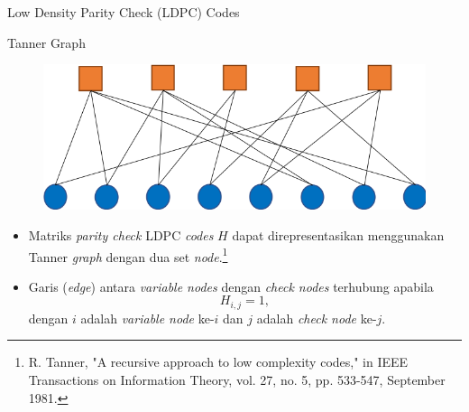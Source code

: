 \documentclass[11pt, aspectratio=169]{beamer}
\begin{document}
\begin{frame}{Low Density Parity Check (LDPC) Codes}
\begin{figure}
\begin{picture}
{		}
		
		\end{picture}
	\end{figure}

	
\end{frame}
\begin{frame}{Tanner Graph}
\vspace{-1cm}
\begin{figure}
\centering 
\includegraphics[scale=0.6]{gambarafa/TannerH}
\centering 
\label{sistemmodelMQCLDPC} %
\end{figure}

\begin{itemize}
\item Matriks \textit{parity check} LDPC \textit{codes} $H$ dapat direpresentasikan menggunakan Tanner \textit{graph} dengan dua set \textit{node}.\footnote[1]{\tiny R. Tanner, "A recursive approach to low complexity codes," in IEEE Transactions on Information Theory, vol. 27, no. 5, pp. 533-547, September 1981.
} 
\item Garis (\textit{edge}) antara \textit{variable nodes} dengan \textit{check nodes} terhubung apabila 
\begin{equation}
 H_{i,j}=1,
\end{equation}
dengan $i$ adalah \textit{variable node} ke-$i$ dan $j$ adalah \textit{check node} ke-$j$.


\end{itemize}


\end{frame}
\end{document}
